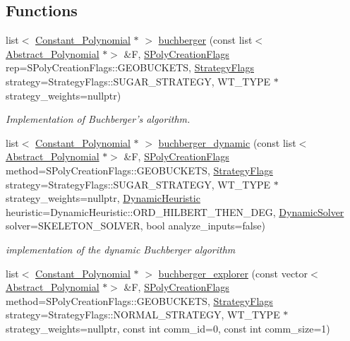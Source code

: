 \subsection*{Functions}
\begin{DoxyCompactItemize}
\item 
list$<$ \hyperlink{group__polygroup_class_constant___polynomial}{Constant\+\_\+\+Polynomial} $\ast$ $>$ \hyperlink{group___g_b_computation_ga37aa7e2fec96fac6c914934a4243f603}{buchberger} (const list$<$ \hyperlink{group__polygroup_class_abstract___polynomial}{Abstract\+\_\+\+Polynomial} $\ast$$>$ \&F, \hyperlink{group___g_b_computation_ga73257b8a2d5cc826853a71b77d0cebf2}{S\+Poly\+Creation\+Flags} rep=S\+Poly\+Creation\+Flags\+::\+G\+E\+O\+B\+U\+C\+K\+E\+TS, \hyperlink{group__strategygroup_ga0ee6c8e033547330e6b89929730007f4}{Strategy\+Flags} strategy=Strategy\+Flags\+::\+S\+U\+G\+A\+R\+\_\+\+S\+T\+R\+A\+T\+E\+GY, W\+T\+\_\+\+T\+Y\+PE $\ast$strategy\+\_\+weights=nullptr)
\begin{DoxyCompactList}\small\item\em Implementation of Buchberger's algorithm. \end{DoxyCompactList}\item 
list$<$ \hyperlink{group__polygroup_class_constant___polynomial}{Constant\+\_\+\+Polynomial} $\ast$ $>$ \hyperlink{group___g_b_computation_ga40140d94eac91d7337f553d362128cb7}{buchberger\+\_\+dynamic} (const list$<$ \hyperlink{group__polygroup_class_abstract___polynomial}{Abstract\+\_\+\+Polynomial} $\ast$$>$ \&F, \hyperlink{group___g_b_computation_ga73257b8a2d5cc826853a71b77d0cebf2}{S\+Poly\+Creation\+Flags} method=S\+Poly\+Creation\+Flags\+::\+G\+E\+O\+B\+U\+C\+K\+E\+TS, \hyperlink{group__strategygroup_ga0ee6c8e033547330e6b89929730007f4}{Strategy\+Flags} strategy=Strategy\+Flags\+::\+S\+U\+G\+A\+R\+\_\+\+S\+T\+R\+A\+T\+E\+GY, W\+T\+\_\+\+T\+Y\+PE $\ast$strategy\+\_\+weights=nullptr, \hyperlink{group___g_b_computation_ga498e6d10e581ed9dca25264cbe825ce0}{Dynamic\+Heuristic} heuristic=Dynamic\+Heuristic\+::\+O\+R\+D\+\_\+\+H\+I\+L\+B\+E\+R\+T\+\_\+\+T\+H\+E\+N\+\_\+\+D\+EG, \hyperlink{group___g_b_computation_ga28fbbb9eb7d8b80ced05c8fa89b2bdac}{Dynamic\+Solver} solver=S\+K\+E\+L\+E\+T\+O\+N\+\_\+\+S\+O\+L\+V\+ER, bool analyze\+\_\+inputs=false)
\begin{DoxyCompactList}\small\item\em implementation of the dynamic Buchberger algorithm \end{DoxyCompactList}\item 
list$<$ \hyperlink{group__polygroup_class_constant___polynomial}{Constant\+\_\+\+Polynomial} $\ast$ $>$ \hyperlink{group___g_b_computation_gaaaca5a3659aba7d4b3a41e253dc1a60f}{buchberger\+\_\+explorer} (const vector$<$ \hyperlink{group__polygroup_class_abstract___polynomial}{Abstract\+\_\+\+Polynomial} $\ast$$>$ \&F, \hyperlink{group___g_b_computation_ga73257b8a2d5cc826853a71b77d0cebf2}{S\+Poly\+Creation\+Flags} method=S\+Poly\+Creation\+Flags\+::\+G\+E\+O\+B\+U\+C\+K\+E\+TS, \hyperlink{group__strategygroup_ga0ee6c8e033547330e6b89929730007f4}{Strategy\+Flags} strategy=Strategy\+Flags\+::\+N\+O\+R\+M\+A\+L\+\_\+\+S\+T\+R\+A\+T\+E\+GY, W\+T\+\_\+\+T\+Y\+PE $\ast$strategy\+\_\+weights=nullptr, const int comm\+\_\+id=0, const int comm\+\_\+size=1)
$$
\end{DoxyCompactItemize}
